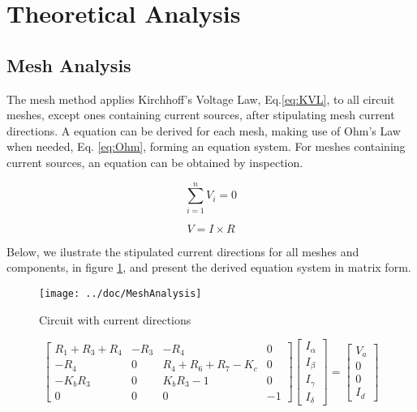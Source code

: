 \section{Theoretical Analysis}
\label{sec:analysis}

\subsection{Mesh Analysis}

\par The mesh method applies Kirchhoff's Voltage Law, Eq.\ref{eq:KVL}, to all circuit meshes, except ones containing current sources, after stipulating mesh current directions. A equation can be derived for each mesh, making use of Ohm's Law when needed, Eq. \ref{eq:Ohm}, forming an equation system. For meshes containing current sources, an equation can be obtained by inspection.

\begin{multicols}{2}
\begin{equation}
    \sum_{i=1}^{n} V_i = 0
    \label{eq:KVL}
\end{equation}

\begin{equation}
    V = I \times R
    \label{eq:Ohm}
\end{equation}
\end{multicols}

Below, we ilustrate the stipulated current directions for all meshes and components, in figure \ref{fig:figmesh}, and present the derived equation system in matrix form.


\begin{figure}[H]
  \centering
  \texttt{[image: ../doc/MeshAnalysis]}
  \caption{Circuit with current directions}
  \label{fig:figmesh}
\end{figure}

\begin{equation*}
\begin{bmatrix} R_1+R_3+R_4 & -R_3 & -R_4 & 0 \\
 -R_4 & 0 & R_4+R_6+R_7-K_c & 0 \\
 -K_bR_3 & 0 & K_bR_3-1 & 0 \\
 0 & 0 & 0 & -1 \end{bmatrix} \begin{bmatrix} I_{\alpha}\\ I_{\beta}\\ I_{\gamma} \\ I_{\delta} \end{bmatrix} = \begin{bmatrix} V_a\\ 0\\ 0\\ I_d \end{bmatrix}
\end{equation*}

